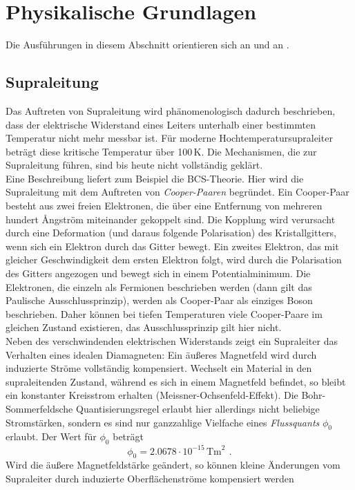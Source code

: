\section{Physikalische Grundlagen}
Die Ausführungen in diesem Abschnitt orientieren sich an \cite{manual} und an \cite{staatsex}.
\subsection{Supraleitung}
Das Auftreten von Supraleitung wird phänomenologisch dadurch beschrieben,
dass der elektrische Widerstand eines Leiters unterhalb einer bestimmten Temperatur nicht mehr
messbar ist. Für moderne Hochtemperatursupraleiter beträgt diese kritische Temperatur über 100\,K.
Die Mechanismen, die zur Supraleitung führen, sind bis heute nicht vollständig geklärt.\\
Eine Beschreibung liefert zum Beispiel die BCS-Theorie.
Hier wird die Supraleitung mit dem Auftreten von \emph{Cooper-Paaren} begründet.
Ein Cooper-Paar besteht aus zwei freien Elektronen, die über eine Entfernung von mehreren hundert Ångström
miteinander gekoppelt sind.
Die Kopplung wird verursacht durch eine Deformation (und daraus folgende Polarisation) des Kristallgitters,
wenn sich ein Elektron durch das Gitter bewegt. Ein zweites Elektron, das mit gleicher Geschwindigkeit
dem ersten Elektron folgt, wird durch die Polarisation des Gitters angezogen und bewegt sich
in einem Potentialminimum.
Die Elektronen, die einzeln als Fermionen beschrieben werden (dann gilt das Paulische Ausschlussprinzip),
werden als Cooper-Paar als einziges Boson beschrieben.
Daher können bei tiefen Temperaturen viele Cooper-Paare im gleichen Zustand existieren,
das Ausschlussprinzip gilt hier nicht.\\
Neben des verschwindenden elektrischen Widerstands zeigt ein Supraleiter das Verhalten eines idealen Diamagneten:
Ein äußeres Magnetfeld wird durch induzierte Ströme vollständig kompensiert.
Wechselt ein Material in den supraleitenden Zustand, während es sich in einem Magnetfeld befindet,
so bleibt ein konstanter Kreisstrom erhalten (Meissner-Ochsenfeld-Effekt).
Die Bohr-Sommerfeldsche Quantisierungsregel erlaubt hier allerdings nicht beliebige Stromstärken,
sondern es sind nur ganzzahlige Vielfache eines \emph{Flussquants} $\phi_0$ erlaubt.
Der Wert für $\phi_0$ beträgt
\begin{equation}
\phi_0 = 2.0678 \cdot 10^{-15}\,\text{Tm}^2 \ \, .
\end{equation}
Wird die äußere Magnetfeldstärke geändert,
so können kleine Änderungen vom Supraleiter durch induzierte Oberflächenströme kompensiert werden
